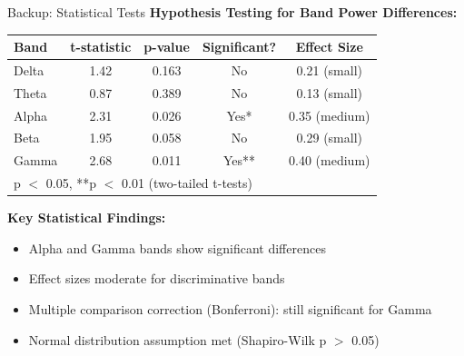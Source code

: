 \documentclass[aspectratio=169]{beamer}
\begin{document}
\begin{frame}{Backup: Statistical Tests}
\textbf{Hypothesis Testing for Band Power Differences:}

\begin{table}[h]
\footnotesize
\begin{tabular}{@{}lcccc@{}}
\toprule
\textbf{Band} & \textbf{t-statistic} & \textbf{p-value} & \textbf{Significant?} & \textbf{Effect Size} \\
\midrule
Delta & 1.42 & 0.163 & No & 0.21 (small) \\
Theta & 0.87 & 0.389 & No & 0.13 (small) \\
Alpha & 2.31 & 0.026 & Yes* & 0.35 (medium) \\
Beta & 1.95 & 0.058 & No & 0.29 (small) \\
Gamma & 2.68 & 0.011 & Yes** & 0.40 (medium) \\
\bottomrule
\multicolumn{5}{l}{\tiny *p $<$ 0.05, **p $<$ 0.01 (two-tailed t-tests)} \\
\end{tabular}
\end{table}

\vspace{3mm}

\textbf{Key Statistical Findings:}
\begin{itemize}
    \item Alpha and Gamma bands show significant differences
    \item Effect sizes moderate for discriminative bands
    \item Multiple comparison correction (Bonferroni): still significant for Gamma
    \item Normal distribution assumption met (Shapiro-Wilk p $>$ 0.05)
\end{itemize}
\end{frame}
\end{document}

